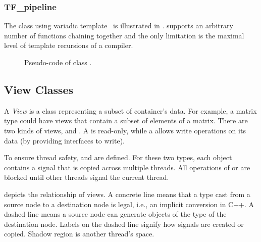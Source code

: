 
\subsubsection{TF\_pipeline}
The  class using variadic template~\cite{vartemp} is
illustrated in .  supports an arbitrary
number of functions chaining together and the only limitation is the maximal
level of template recursions of a compiler.


\begin{figure}[hbt]
  \caption{Pseudo-code of class .}
  \label{fig:pipeline:code}
\end{figure}


\subsection{View Classes}
\label{sec:view}

A \emph{View} is a class representing a subset of container's data. For example,
a matrix type could have views that contain a subset of elements of a matrix.
There are two kinds of views,  and .
A  is read-only, while a  allows write operations on its data
(by providing interfaces to write). 

To ensure thread safety,  and  are
defined. For these two types, each object contains a signal that is copied across multiple
threads. All operations of  or  are blocked until
other threads signal the current thread.

 depicts the relationship of views. A concrete line means that
a type cast from a source node to a destination node is legal, i.e., an implicit
conversion in C++.  A dashed line means a source node can generate objects of
the type of the destination node. Labels on the dashed line signify how
signals are created or copied.
Shadow region is another thread's space.

